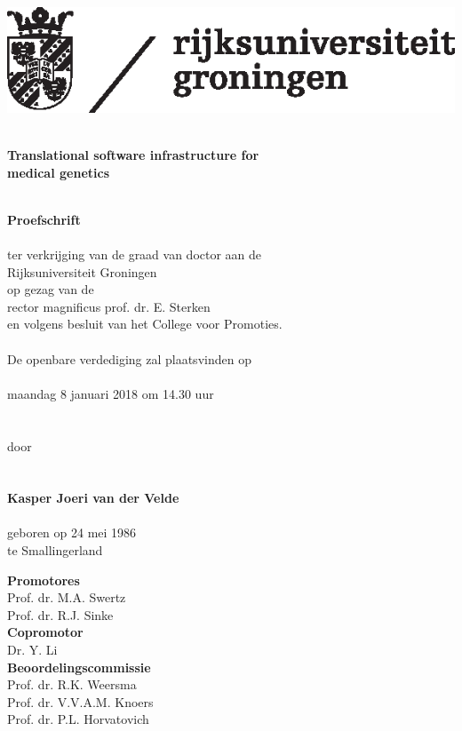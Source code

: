 \begin{flushleft}
\includegraphics[scale=0.8]{img/rugr_logonl_zwart_cmyk}
\end{flushleft}

\begin{center}
\linespread{1.00} %
~\\
\huge
\textbf{Translational software infrastructure for \\ medical genetics}
\\~\\
\linespread{1.05} %


\large
\textbf{Proefschrift}
\\~\\
\normalsize
ter verkrijging van de graad van doctor aan de\\
Rijksuniversiteit Groningen\\
op gezag van de\\
rector magnificus prof. dr. E. Sterken\\
en volgens besluit van het College voor Promoties.
\\~\\
De openbare verdediging zal plaatsvinden op
\\~\\
maandag 8 januari 2018 om 14.30 uur 
\\~\\~\\
door
\\~\\~\\
\large
\textbf{Kasper Joeri van der Velde}
\\~\\
\normalsize
geboren op 24 mei 1986\\
te Smallingerland\\
\normalsize
\end{center}

\clearpage

\noindent
\textbf{Promotores}\\
Prof. dr. M.A. Swertz\\
Prof. dr. R.J. Sinke\\

\noindent
\textbf{Copromotor}\\
Dr. Y. Li\\

\noindent
\textbf{Beoordelingscommissie}\\
Prof. dr. R.K. Weersma\\
Prof. dr. V.V.A.M. Knoers\\
Prof. dr. P.L. Horvatovich\\
